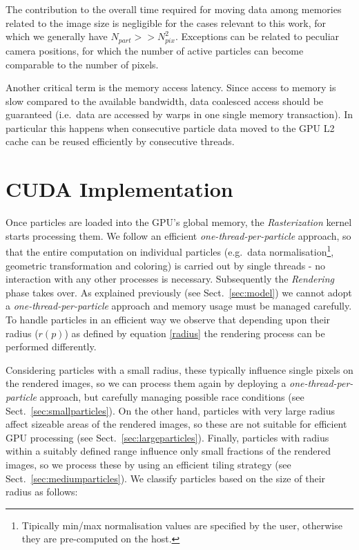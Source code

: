 \documentclass[preprint,5pt]{elsarticle}
\begin{document}
The contribution to the overall time required for moving data among memories related to the image size is negligible for the cases relevant to this work, 
for which we generally have $N_{part} >>  N_{pix}^2$. Exceptions can be related to peculiar camera positions, for which the number of  active particles can become comparable to the number of pixels. 

Another critical term is the memory access latency. 
Since access to memory is slow compared to
the available bandwidth, 
data coalesced access should be guaranteed (i.e.\ data are accessed by warps in one single memory transaction). In particular this happens when consecutive particle data moved to the GPU L2 cache can be reused efficiently by consecutive threads. 

\section{CUDA Implementation}
\label{sec:implementation}

Once particles are loaded into the GPU's global memory, the {\it Rasterization} kernel starts processing them. We follow an efficient {\it one-thread-per-particle} approach, so that the entire computation on individual particles (e.g.~data normalisation\footnote{Tipically min/max normalisation values are specified by the user, otherwise they are pre-computed on the host.}, geometric transformation and coloring) is carried out by single threads - no interaction with any other processes is necessary. 
Subsequently the {\it Rendering} phase takes over. As explained previously (see Sect.~\ref{sec:model}) we cannot adopt a {\it one-thread-per-particle} approach and memory usage must be managed carefully. To handle particles in an efficient way we observe that depending upon their radius ($r(p)$) as defined by equation \eqref{radius} the rendering process can be performed differently.

Considering particles with a small radius, these typically influence single pixels on the rendered images, so we can process them again by deploying a {\it one-thread-per-particle} approach, but carefully managing possible race conditions (see Sect.~\ref{sec:smallparticles}). On the other hand, particles with very large radius affect sizeable areas of the rendered images, so these are not suitable for efficient GPU processing (see Sect.~\ref{sec:largeparticles}). Finally, particles with radius within a suitably defined range influence only small fractions of the rendered images, so we process these by using an efficient tiling strategy (see Sect.~\ref{sec:mediumparticles}). We classify particles based on the size of their radius as follows:
\end{document}
